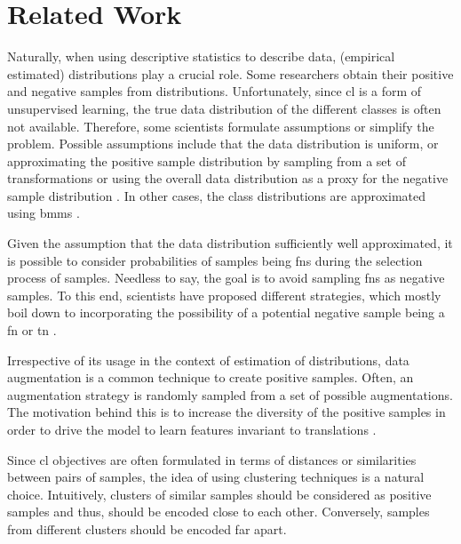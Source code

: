 \section{Related Work}\label{sec:related_work}

Naturally, when using descriptive statistics to describe data, (empirical estimated) distributions play a crucial role.
Some researchers obtain their positive and negative samples from distributions.
Unfortunately, since \ac{cl} is a form of unsupervised learning, 
the true data distribution of the different classes is often not available.
Therefore, some scientists formulate assumptions or simplify the problem.
Possible assumptions include that the data distribution is uniform,
or approximating the positive sample distribution by sampling from a set of transformations 
or using the overall data distribution as a proxy for the negative sample distribution \citet{chuang_debiased_2020,robinson_contrastive_2021}.
In other cases, the class distributions are approximated using \acp{bmm} \citet{progcl_2022}.

Given the assumption that the data distribution sufficiently well approximated, 
it is possible to consider probabilities of samples being \acp{fn} during the selection process of samples.
Needless to say, the goal is to avoid sampling \acp{fn} as negative samples.
To this end, scientists have proposed different strategies, which mostly boil down to 
incorporating the possibility of a potential negative sample being a \ac{fn} or \ac{tn} 
\citet{chuang_debiased_2020,robinson_contrastive_2021,progcl_2022}.


Irrespective of its usage in the context of estimation of distributions, 
data augmentation is a common technique to create positive samples.
Often, an augmentation strategy is randomly sampled from a set of possible augmentations.
The motivation behind this is to increase the diversity of the positive samples 
in order to drive the model to learn features invariant to translations 
\citet{PIC_2020,swav_2020,local_aggr_2019,grape_2024,CL_temp_2021}.


Since \ac{cl} objectives are often formulated in terms of distances or similarities between pairs of samples, 
the idea of using clustering techniques is a natural choice.
Intuitively, clusters of similar samples should be considered as positive samples and thus,
should be encoded close to each other.
Conversely, samples from different clusters should be encoded far apart.

